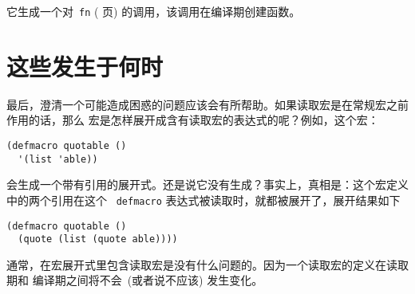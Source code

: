 它生成一个对~\verb|fn| (\pageref{fig:general_function-building_macro} 页)
的调用，该调用在编译期创建函数。

\section{这些发生于何时}
\label{sec:when_what_happens}

最后，澄清一个可能造成困惑的问题应该会有所帮助。如果读取宏是在常规宏之前作用的话，那么
宏是怎样展开成含有读取宏的表达式的呢？例如，这个宏：
\begin{lstlisting}
(defmacro quotable ()
  '(list 'able))
\end{lstlisting}
会生成一个带有引用的展开式。还是说它没有生成？事实上，真相是：这个宏定义中的两个引用在这个
~\texttt{defmacro} 表达式被读取时，就都被展开了，展开结果如下
\begin{lstlisting}
(defmacro quotable ()
  (quote (list (quote able))))
\end{lstlisting}
通常，在宏展开式里包含读取宏是没有什么问题的。因为一个读取宏的定义在读取期和
编译期之间将不会~(或者说不应该) 发生变化。

